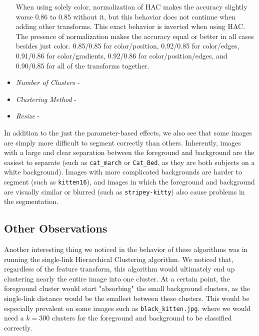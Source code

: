 \documentclass[12pt]{article}
\begin{document}
\begin{itemize}
		When using solely color, normalization of HAC makes the accuracy slightly worse 0.86 to 0.85 without it, but this behavior does not continue when adding other transforms. This exact behavior is inverted when using HAC. The presence of normalization makes the accuracy equal or better in all cases besides just color. 0.85/0.85 for color/position, 0.92/0.85 for color/edges, 0.91/0.86 for color/gradients, 0.92/0.86 for color/position/edges, and 0.90/0.85 for all of the transforms together. 
	
	\item \textit{Number of Clusters} -
	\item \textit{Clustering Method} - 
	\item \textit{Resize} - 
\end{itemize}

In addition to the just the parameter-based effects, we also see that some images are simply more difficult to segment correctly than others. Inherently, images with a large and clear separation between the foreground and background are the easiest to separate (such as \texttt{cat\_march} or \texttt{Cat\_Bed}, as they are both subjects on a white background). Images with more complicated backgrounds are harder to segment (such as \texttt{kitten16}), and images in which the foreground and background are visually similar or blurred (such as \texttt{stripey-kitty}) also cause problems in the segmentation.

\subsection{Other Observations}
Another interesting thing we noticed in the behavior of these algorithms was in running the single-link Hierarchical Clustering algorithm. We noticed that, regardless of the feature transform, this algorithm would ultimately end up clustering nearly the entire image into one cluster. At a certain point, the foreground cluster would start "absorbing" the small background clusters, as the single-link distance would be the smallest between these clusters. This would be especially prevalent on some images such as \texttt{black\_kitten.jpg}, where we would need a $k = 300$ clusters for the foreground and background to be classified correctly.
\end{document}

